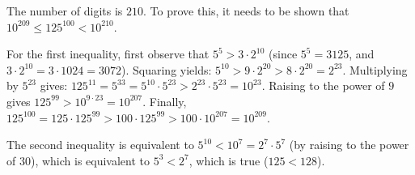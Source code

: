 The number of digits is $210$.
To prove this, it needs to be shown that
$10^{209} \leq 125^{100} < 10^{210}$.

For the first inequality, first observe that $5^5 > 3 \cdot 2^{10}$
(since $5^5 = 3125$, and $3 \cdot 2^{10} = 3 \cdot 1024 = 3072$).
Squaring yields:
$5^{10}
 > 9 \cdot 2^{20}
 > 8 \cdot 2^{20}
 = 2^{23}$.
Multiplying by $5^{23}$ gives:
$125^{11}
 = 5^{33}
 = 5^{10} \cdot 5^{23}
 > 2^{23} \cdot 5^{23}
 = 10^{23}$.
Raising to the power of $9$ gives
$125^{99}
 > 10^{9 \cdot 23}
 = 10^{207}$.
Finally,
$125^{100}
 = 125 \cdot 125^{99}
 > 100 \cdot 125^{99}
 > 100 \cdot 10^{207}
 = 10^{209}$.

The second inequality is equivalent to
$5^{10} < 10^{7} = 2^7 \cdot 5^7$
(by raising to the power of $30$),
which is equivalent to $5^3 < 2^7$,
which is true ($125 < 128$).
